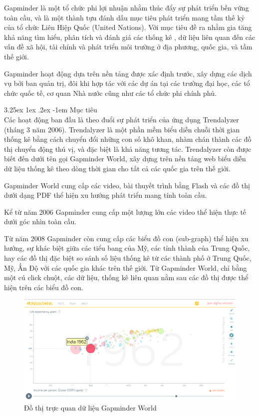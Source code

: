\documentclass[12pt,a4paper]{article}
\makeatletter
\newcommand{\myparagraph}[1]{\paragraph{#1}\mbox{}\\} %
\renewcommand\paragraph{\@startsection{paragraph}{5}{\z@}%
  {3.25ex \@plus1ex \@minus.2ex}%
  {-1em}%
  {\normalfont\normalsize\bfseries}}
\makeatother
\begin{document}
Gapminder là một tổ chức phi lợi nhuận nhằm thúc đẩy sự phát triển bền vững toàn cầu, và là một thành tựu đánh dấu mục tiêu phát triển mang tầm thế kỷ của tổ chức Liên Hiệp Quốc (United Nations). Với mục tiêu đề ra nhằm gia tăng khả năng tìm hiểu, phân tích và đánh giá các thống kê , dữ liệu liên quan đến các vấn đề xã hội, tài chính và phát triển môi trường ở địa phương, quốc gia, và tầm thế giới.

Gapminder hoạt động dựa trên nền tảng được xác định trước, xây dựng các dịch vụ bởi ban quản trị, đôi khi hợp tác với các dự án  tại các trường đại học, các tổ chức quốc tế, cơ quan Nhà nước cũng như các tổ chức phi chính phủ.

\myparagraph{Mục tiêu}
Các hoạt động ban đầu là theo đuổi sự phát triển của ứng dụng Trendalyzer (tháng 3 năm 2006). Trendalyzer là một phần mềm biểu diễn chuỗi thời gian thống kê bằng cách chuyển đổi những con số khô khan, nhàm chán thành các đồ thị chuyển động thú vị, và đặc biệt là khả năng tương tác. Trendalyzer còn được biết đến dưới tên gọi Gapminder World, xây dựng trên nền tảng web biểu diễn dữ liệu thống kê theo dòng thời gian cho tất cả các quốc gia trên thế giới.

Gapminder World\cite{gapminderworld} cung cấp các video, bài thuyết trình bằng Flash và các đồ thị dưới dạng PDF thể hiện xu hướng phát triển mang tính toàn cầu. 

Kể từ năm 2006 Gapminder cung cấp một lượng lớn các video thể hiện thực tế dưới góc nhìn toàn cầu. 

Từ năm 2008 Gapminder còn cung cấp các biểu đồ con (sub-graph)\cite{subgraph} thể hiện xu hướng, sự khác biệt giữa các tiểu bang của Mỹ, các tỉnh thành của Trung Quốc, hay các đồ thị đặc biệt so sánh số liệu thống kê từ các thành phố ở Trung Quốc, Mỹ, Ấn Độ với các quốc gia khác trên thế giới. Từ Gapminder World, chỉ bằng một cú click chuột, các dữ liệu, thống kê liên quan nằm sau các đồ thị được thể hiện trên các biểu đồ con.

\begin{figure}[htp]
	\begin{center}
    \includegraphics[scale=.4]{image/gapminder}
    \caption{Đồ thị trực quan dữ liệu Gapminder World}
    \label{fig:gapminder}
	\end{center}
\end{figure}
\end{document}
